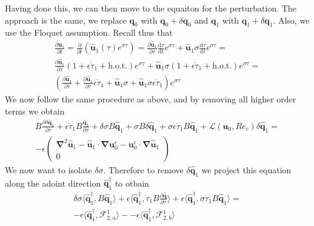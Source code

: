 Having done this, we can then move to the equaiton for the perturbation. The approach is the same, we replace $\bm{q}_0$ with $\bm{q}_0 + \delta \bm{q}_0$ and $\bm{q}_1$ with $\bm{q}_1 + \delta \bm{q}_1$. Also, we use the Floquet assumption. Recall thus that
%
\begin{equation}
  \begin{gathered}
  \frac{\partial \bm{u}_1}{\partial t} = \frac{\partial}{\partial t} \left( \hat{\bm{u}}_1(\tau) e^{\sigma \tau} \right) = 
  \frac{\partial \hat{\bm{u}}_1}{\partial \tau} \frac{\text{d} \tau}{\text{d} t} e^{\sigma \tau} +
  \hat{\bm{u}}_1 \sigma \frac{\text{d} \tau}{\text{d} t} e^{\sigma \tau} = \\
  \frac{\partial \hat{\bm{u}}_1}{\partial \tau} \left( 1 + \epsilon \dot{\tau}_1 + \text{h.o.t.} \right) e^{\sigma \tau} +
  \hat{\bm{u}}_1 \sigma ( 1 + \epsilon \dot{\tau}_1 + \text{h.o.t.} ) e^{\sigma \tau} = \\
  \left( \frac{\partial \hat{\bm{u}}_1}{\partial \tau} + \frac{\partial \hat{\bm{u}}_1}{\partial \tau} \epsilon \dot{\tau}_1 + \hat{\bm{u}}_1 \sigma + \hat{\bm{u}}_1 \sigma \epsilon \dot{\tau}_1 \right) e^{\sigma \tau}
  \end{gathered}
\end{equation}
We now follow the same procedure as above, and by removing all higher order terms we obtain
%
\begin{equation}
  \begin{gathered}
  B \frac{\partial \delta \hat{\bm{q}}_1}{\partial \tau} +
  \epsilon \dot{\tau}_1 B \frac{ \hat{\bm{q}}_1 }{\partial \tau} +
  \delta \sigma B \hat{\bm{q}}_1 +
  \sigma B \delta \hat{\bm{q}}_1 + 
  \sigma \epsilon \dot{\tau}_1 B \hat{\bm{q}}_1 +
  \mathcal{L}(\bm{u}_0,Re_c) \delta \hat{\bm{q}}_1 = \\
  - \epsilon \begin{pmatrix} \bm{\nabla}^2 \hat{\bm{u}}_1 - \hat{\bm{u}}_1 \cdot \bm{\nabla} \bm{u}_0^\epsilon -
                                                            \bm{u}_0^\epsilon \cdot \bm{\nabla} \hat{\bm{u}}_1 \\ 0 \end{pmatrix}
  \end{gathered}
\end{equation}
%
We now want to isolate $\delta \sigma$. Therefore to remove $\delta \hat{\bm{q}}_1$ we project this equation along the adoint direction $\hat{\bm{q}}_1^\dagger$ to otbain
%
\begin{equation}
  \begin{gathered}
  \delta \sigma \langle \hat{\bm{q}}_1^\dagger, B \hat{\bm{q}}_1 \rangle +
  \epsilon \langle \hat{\bm{q}}_1^\dagger, \dot{\tau}_1 B \frac{\partial \hat{\bm{q}} }{\partial \tau} \rangle +
  \epsilon \langle \hat{\bm{q}}_1^\dagger, \sigma \dot{\tau}_1 B \hat{\bm{q}}_1 \rangle =  \\
  - \epsilon \langle \hat{\bm{q}}_1^\dagger, \mathcal{F}_{2,a}^1 \rangle -
  - \epsilon \langle \hat{\bm{q}}_1^\dagger, \mathcal{F}_{2,b}^1 \rangle
  \end{gathered}
\end{equation}
